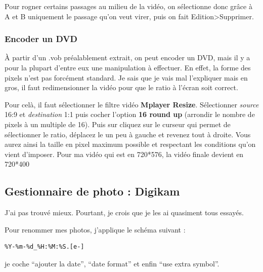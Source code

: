 \documentclass[a4paper,twoside]{article}
\begin{document}
Pour rogner certains passages au milieu de la vidéo, on sélectionne donc grâce à A et B uniquement le passage qu'on veut virer, puis on fait Edition>Supprimer.

\subsubsection{Encoder un DVD}\label{sec:encoder_DVD}
À partir d'un .vob préalablement extrait, on peut encoder un DVD, mais il y a pour la plupart d'entre eux une manipulation à effectuer. En effet, la forme des pixels n'est pas forcément standard. Je sais que je vais mal l'expliquer mais en gros, il faut redimensionner la vidéo pour que le ratio à l'écran soit correct.

Pour celà, il faut sélectionner le filtre vidéo \textbf{Mplayer Resize}. Sélectionner \emph{source} 16:9 et \emph{destination} 1:1 puis cocher l'option \textbf{16 round up} (arrondir le nombre de pixels à un multiple de 16). Puis sur cliquez sur le curseur qui permet de sélectionner le ratio, déplacez le un peu à gauche et revenez tout à droite. Vous aurez ainsi la taille en pixel maximum possible et respectant les conditions qu'on vient d'imposer. Pour ma vidéo qui est en 720*576, la vidéo finale devient en 720*400



\subsection{Gestionnaire de photo : Digikam}
J'ai pas trouvé mieux. Pourtant, je crois que je les ai quasiment tous essayés.

Pour renommer mes photos, j'applique le schéma suivant :
\begin{verbatim}
%Y-%m-%d_%H:%M:%S.[e-]
\end{verbatim}
je coche ``ajouter la date'', ``date format'' et enfin ``use extra symbol''.
\end{document}
